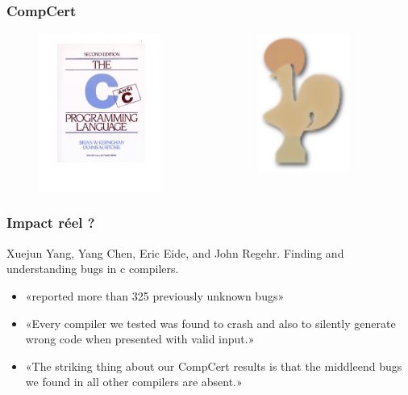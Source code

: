 \documentclass[xetex]{beamer}
\begin{document}
\begin{frame}

\frametitle{CompCert}

\begin{figure}[H]
\begin{columns}
\begin{column}{0.4\textwidth}
\centering
\includegraphics[width=4cm]{k_and_r.png}
\end{column}
\begin{column}{0.2\textwidth}
\centering \resizebox{2cm}{!}{+}
\end{column}
\begin{column}{0.4\textwidth}
\centering
\includegraphics[width=3cm]{coq.png}
\end{column}
\end{columns}
\end{figure}

\end{frame}


\begin{frame}[fragile]

\frametitle{Impact réel ?}

Xuejun Yang, Yang Chen, Eric Eide, and John Regehr.
Finding and understanding bugs in c compilers.
\cite{Yang11}

\begin{itemize}

\item «reported more than 325 previously unknown bugs»

\item «Every compiler we tested was found to crash and also to silently
generate wrong code when presented with valid input.»

\item «The striking thing about our CompCert results is that the middleend bugs
we found in all other compilers are absent.»

\end{itemize}

\end{frame}
\end{document}
